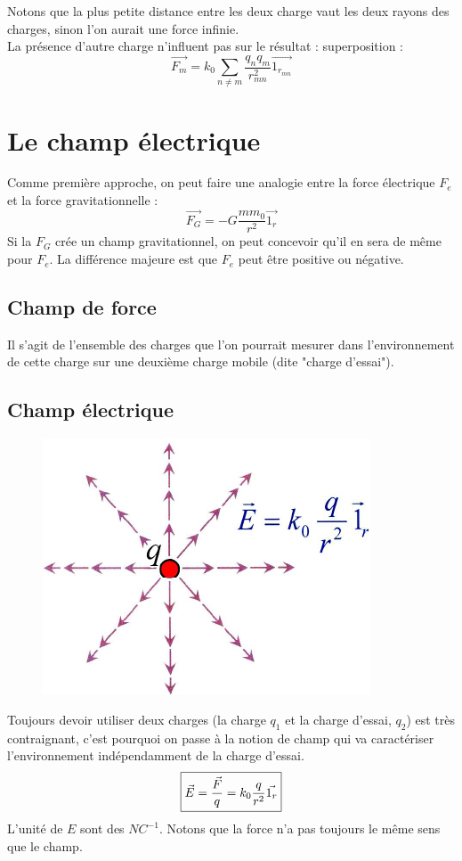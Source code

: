 \documentclass	[11pt, a4paper, openany]{book}
\begin{document}
Notons que la plus petite distance entre les deux charge vaut les deux rayons des charges, sinon l'on aurait une force infinie.\\
La présence d'autre charge n'influent pas sur le résultat :  superposition :
\begin{equation}
\vec{F_m} = k_0\sum_{n\neq m} \frac{q_nq_m}{r^2_{mn}}\vec{1_{r_{mn}}}
\end{equation}

\section{Le champ électrique}
Comme première approche, on peut faire une analogie entre la force électrique $F_e$ et la force gravitationnelle :
\begin{equation}
\vec{F_G} = -G \frac{mm_0}{r^2}\vec{1_r}
\end{equation}
Si la $F_G$ crée un champ gravitationnel, on peut concevoir qu'il en sera de même pour $F_e$. La différence majeure est que $F_e$ peut être positive ou négative.

\subsection{Champ de force}
Il s'agit de l'ensemble des charges que l'on pourrait mesurer dans l'environnement de cette charge sur une deuxième charge mobile (dite "charge d'essai").

\subsection{Champ électrique}
\begin{figure}
\includegraphics[scale=0.34]{es/image3.png}
\end{figure}
Toujours devoir utiliser deux charges (la charge $q_1$ et la charge d'essai, $q_2$) est très contraignant, c'est pourquoi on passe à la notion de champ qui va caractériser l'environnement indépendamment de la charge d'essai.
\begin{equation}
\fbox{$\vec{E} = \dfrac{\vec{F}}{q} = k_0\dfrac{q}{r^2}\vec{1_r}$}
\end{equation}
L'unité de $E$ sont des $NC^{-1}$. Notons que la force n'a pas toujours le même sens que le champ.
\end{document}
